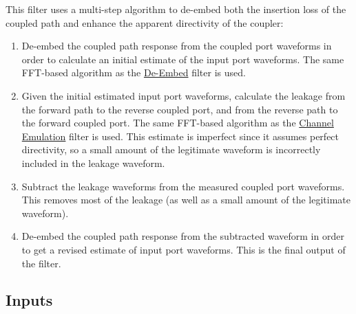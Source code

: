 This filter uses a multi-step algorithm to de-embed both the insertion loss of the coupled path and enhance the
apparent directivity of the coupler:

\begin{enumerate}

\item De-embed the coupled path response from the coupled port waveforms in order to calculate an initial estimate of
the input port waveforms. The same FFT-based algorithm as the \hyperref[filter:deembed]{De-Embed} filter is used.

\item Given the initial estimated input port waveforms, calculate the leakage from the forward path to the reverse
coupled port, and from the reverse path to the forward coupled port. The same FFT-based algorithm as the
\hyperref[filter:channelemu]{Channel Emulation} filter is used. This estimate is imperfect since it assumes perfect
directivity, so a small amount of the legitimate waveform is incorrectly included in the leakage waveform.

\item Subtract the leakage waveforms from the measured coupled port waveforms. This removes most of the leakage (as
well as a small amount of the legitimate waveform).

\item De-embed the coupled path response from the subtracted waveform in order to get a revised estimate of input
port waveforms. This is the final output of the filter.

\end{enumerate}

\subsection{Inputs}

